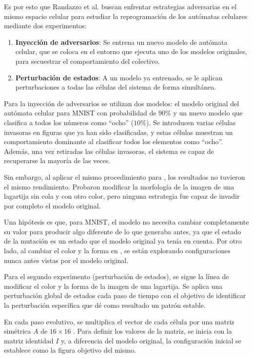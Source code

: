 Es por esto que Randazzo et al. \cite{mordvintsev2021_a_nca} buscan enfrentar estrategias adversarias en el mismo espacio celular para estudiar la reprogramación de los autómatas celulares mediante dos experimentos:
\begin{enumerate}
	\item \textbf{Inyección de adversarios}: Se entrena un nuevo modelo de autómata celular, que se coloca en el entorno que ejecuta uno de los modelos originales, para secuestrar el comportamiento del colectivo.
	
	\item \textbf{Perturbación de estados}: A un modelo ya entrenado, se le aplican perturbaciones a todas las células del sistema de forma simultánea.
\end{enumerate}

Para la inyección de adversarios se utilizan dos modelos: el modelo original del autómata celular para MNIST con probabilidad de $90\%$ y un nuevo modelo que clasifica a todos los números como ``ocho'' ($10\%$). Se introducen varias células invasoras en figuras que ya han sido clasificadas, y estas células muestran un comportamiento dominante al clasificar todos los elementos como ``ocho''. Además, una vez retiradas las células invasoras, el sistema es capaz de recuperarse la mayoría de las veces.

Sin embargo, al aplicar el mismo procedimiento para \cite{mordvintsev2020_nca}, los resultados no tuvieron el mismo rendimiento. Probaron modificar la morfología de la imagen de una lagartija sin cola y con otro color, pero ninguna estrategia fue capaz de invadir por completo el modelo original. 

Una hipótesis es que, para MNIST, el modelo no necesita cambiar completamente su valor para producir algo diferente de lo que generaba antes, ya que el estado de la mutación es un estado que el modelo original ya tenía en cuenta. Por otro lado, al cambiar el color y la forma en \cite{mordvintsev2020_nca}, se están explorando configuraciones nunca antes vistas por el modelo original.

Para el segundo experimento (perturbación de estados), se sigue la línea de modificar el color y la forma de la imagen de una lagartija. Se aplica una perturbación global de estados cada paso de tiempo con el objetivo de identificar la perturbación específica que dé como resultado un patrón estable.

En cada paso evolutivo, se multiplica el vector de cada célula por una matriz simétrica $A$ de $16 \times 16$ \cite{mordvintsev2020_nca}. Para definir los valores de la matriz, se inicia con la matriz identidad $I$ y, a diferencia del modelo original, la configuración inicial se establece como la figura objetivo del mismo.

